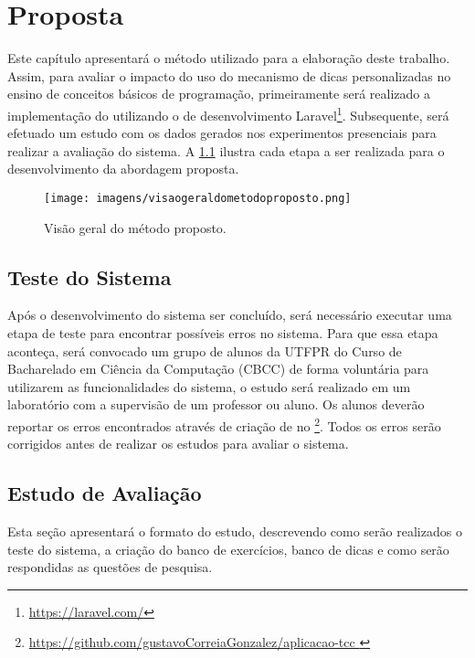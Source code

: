 \chapter{Proposta}

Este capítulo apresentará o método utilizado para a elaboração deste trabalho. Assim, para avaliar o impacto do uso do mecanismo de dicas personalizadas no ensino de conceitos básicos de programação, primeiramente será realizado a implementação do  utilizando o  de desenvolvimento Laravel\footnote{\url{https://laravel.com/}}. Subsequente, será efetuado um estudo com os dados gerados nos experimentos presenciais para realizar a avaliação do sistema. A \cref{figura:visaometodo} ilustra cada etapa a ser realizada para o desenvolvimento da abordagem proposta.

\begin{figure}[ht]
	\captionsetup{justification=centering}
	\texttt{[image: imagens/visaogeraldometodoproposto.png]}
	\caption{Visão geral do método proposto.}
	\label{figura:visaometodo}
\end{figure}

\section{Teste do Sistema}

Após o desenvolvimento do sistema ser concluído, será necessário executar uma etapa de teste para encontrar possíveis erros no sistema. Para que essa etapa aconteça, será convocado um grupo de alunos da UTFPR do Curso de Bacharelado em Ciência da Computação (CBCC) de forma voluntária para utilizarem as funcionalidades do sistema, o estudo será realizado em um laboratório com a supervisão de um professor ou aluno. Os alunos deverão reportar os erros encontrados através de criação de  no  \footnote{\url{https://github.com/gustavoCorreiaGonzalez/aplicacao-tcc }}. Todos os erros serão corrigidos antes de realizar os estudos para avaliar o sistema.

\section{Estudo de Avaliação}

Esta seção apresentará o formato do estudo, descrevendo como serão realizados o teste do sistema, a criação do banco de exercícios, banco de dicas e como serão respondidas as questões de pesquisa.

